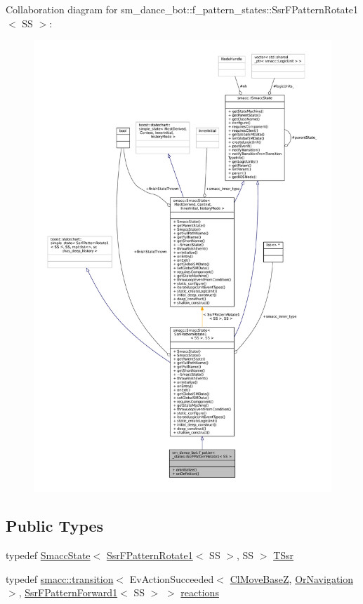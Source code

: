 Collaboration diagram for sm\+\_\+dance\+\_\+bot\+:\+:f\+\_\+pattern\+\_\+states\+:\+:Ssr\+F\+Pattern\+Rotate1$<$ SS $>$\+:
\nopagebreak
\begin{figure}[H]
\begin{center}
\leavevmode
\includegraphics[width=350pt]{structsm__dance__bot_1_1f__pattern__states_1_1SsrFPatternRotate1__coll__graph}
\end{center}
\end{figure}
\subsection*{Public Types}
\begin{DoxyCompactItemize}
\item 
typedef \hyperlink{classSmaccState}{Smacc\+State}$<$ \hyperlink{structsm__dance__bot_1_1f__pattern__states_1_1SsrFPatternRotate1}{Ssr\+F\+Pattern\+Rotate1}$<$ SS $>$, SS $>$ \hyperlink{structsm__dance__bot_1_1f__pattern__states_1_1SsrFPatternRotate1_a41bb1cc142d247da6d99126c34f768bb}{T\+Ssr}
\item 
typedef \hyperlink{classsmacc_1_1transition}{smacc\+::transition}$<$ Ev\+Action\+Succeeded$<$ \hyperlink{classmove__base__z__client_1_1ClMoveBaseZ}{Cl\+Move\+BaseZ}, \hyperlink{classsm__dance__bot_1_1OrNavigation}{Or\+Navigation} $>$, \hyperlink{structsm__dance__bot_1_1f__pattern__states_1_1SsrFPatternForward1}{Ssr\+F\+Pattern\+Forward1}$<$ SS $>$ $>$ \hyperlink{structsm__dance__bot_1_1f__pattern__states_1_1SsrFPatternRotate1_a1d2c755267089ae9d9f1bc6ea6e64aa0}{reactions}
\end{DoxyCompactItemize}
